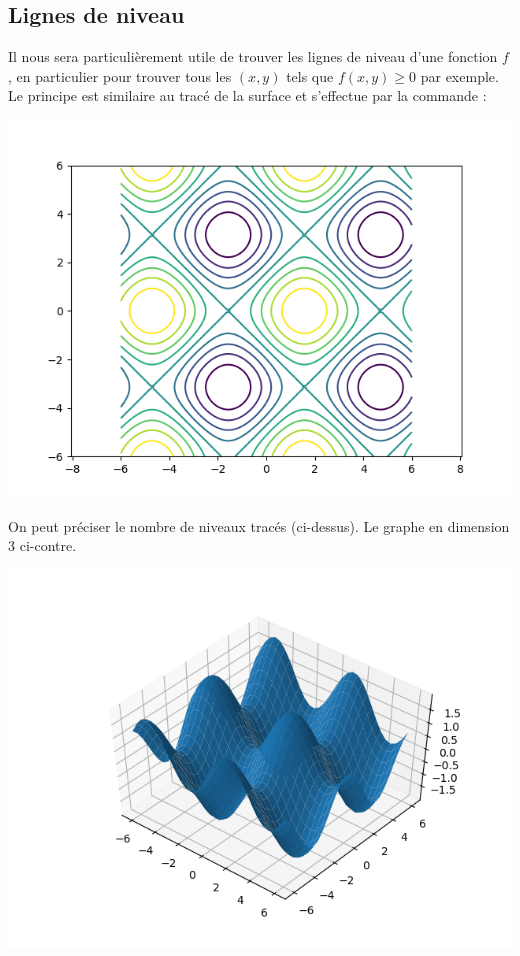 \documentclass[11pt,class=report,crop=false]{standalone}
\begin{document}
\subsection{Lignes de niveau}

Il nous sera particulièrement utile de trouver les lignes de niveau d'une fonction $f$, en particulier pour trouver tous les $(x,y)$ tels que $f(x,y)\ge0$ par exemple.
Le principe est similaire au tracé de la surface et s'effectue par la commande : 
\begin{center}
\includegraphics[scale=\myscale,scale=0.8]{figures/pythonxy-niveau-2d-1}
\end{center}

\begin{minipage}{0.45\textwidth}
On peut préciser le nombre de niveaux tracés
 (ci-dessus). Le graphe en dimension $3$ ci-contre.
\end{minipage}
\begin{minipage}{0.45\textwidth}
\begin{center}
\includegraphics[scale=\myscale,scale=0.5]{figures/pythonxy-niveau-3d-1}
\end{center}
\end{minipage}
\end{document}
